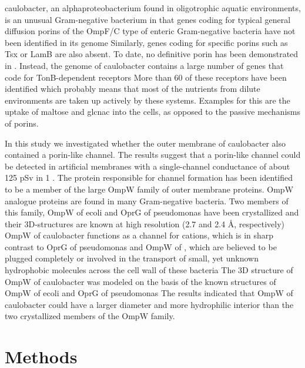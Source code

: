     \ac{caulobacter}, an alphaproteobacterium found in oligotrophic aquatic environments, is an unusual Gram-negative bacterium in that genes coding for typical general diffusion porins of the OmpF/C type of enteric Gram-negative bacteria have not been identified in its genome Similarly, genes coding for specific porins such as Tsx or LamB are also absent. To date, no definitive porin has been demonstrated in \caulobacter. Instead, the genome of \ac{caulobacter} contains a large number of genes that code for TonB-dependent receptors More than 60 of these receptors have been identified which probably means that most of the nutrients from dilute environments are taken up actively by these systems. Examples for this are the uptake of maltose and \ac{glcnac} into the cells, as opposed to the passive mechanisms of porins.

    In this study we investigated whether the outer membrane of \ac{caulobacter} also contained a porin-like channel. The results suggest that  a porin-like channel could be detected in artificial membranes with a single-channel conductance of about 125 \si{\pico\sievert} in 1 \si{\molar} . The protein responsible for channel formation has been identified to be a member of the large OmpW family of outer membrane proteins. OmpW analogue proteins are found in many Gram-negative bacteria. Two members of this family, OmpW of \ac{ecoli} and OprG of \ac{pseudomonas} have been crystallized and their 3D-structures are known at high resolution (2.7 and 2.4 \AA, respectively)  OmpW of \ac{caulobacter} functions as a channel for cations, which is in sharp contrast to OprG of \ac{pseudomonas} and OmpW of \ecoli, which are believed to be plugged completely or involved in the transport of small, yet unknown hydrophobic molecules across the cell wall of these bacteria The 3D structure of OmpW of \ac{caulobacter} was modeled on the basis of the known structures of OmpW of \ac{ecoli} and OprG of \ac{pseudomonas} The results indicated that OmpW of \ac{caulobacter} could have a larger diameter and more hydrophilic interior than the two crystallized members of the OmpW family.

\section{Methods}
\label{sec:porin_methods}
